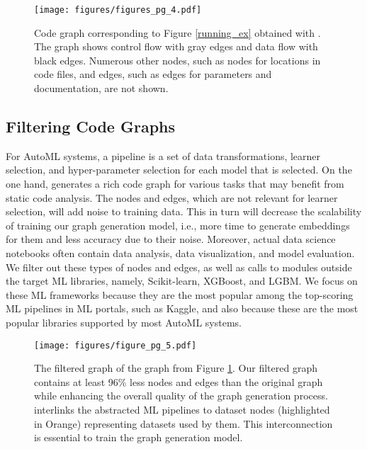 \begin{figure}
 \centering
  \texttt{[image: figures/figures\_pg\_4.pdf]}
  \ncp\ncp\ncp\ncp
  \caption{Code graph corresponding to Figure \ref{running_ex} obtained with {\sysGC}.  The graph shows control flow with gray edges and data flow with black edges. Numerous other nodes, such as nodes for locations in code files, and edges, such as edges for parameters and documentation, are not shown.}
  \label{static_analysis}
  \ncp\ncp\ncp\ncp
\end{figure}

     


\subsection{Filtering Code Graphs}
\label{abstraction}

For AutoML systems, a pipeline is a set of data transformations, learner selection, and hyper-parameter selection for each model that is selected. On the one hand, {\sysGC} generates a rich code graph for various tasks that may benefit from static code analysis. The nodes and edges, which are not relevant for learner selection, will add noise to training data. This in turn will decrease the scalability of training our graph generation model, i.e., more time to generate embeddings for them and less accuracy due to their noise. Moreover, actual data science notebooks often contain data analysis, data visualization, and model evaluation. We filter out these types of nodes and edges, as well as calls to modules outside the target ML libraries, namely, Scikit-learn, XGBoost, and LGBM. We focus on these ML frameworks because they are the most popular among the top-scoring ML pipelines in ML portals, such as Kaggle, and also because these are the most popular libraries supported by most AutoML systems. 

\begin{figure}
\ncp\ncp
 \centering
  \texttt{[image: figures/figure\_pg\_5.pdf]}
  \ncp\ncp\ncp\ncp\ncp\ncp\ncp
  \caption{The filtered graph of the graph from Figure \ref{static_analysis}. Our filtered graph contains at least 96\% less nodes and edges than the original graph while enhancing the overall quality of the graph generation process. {\sysname} interlinks the abstracted ML pipelines to dataset nodes (highlighted in Orange) representing datasets used by them. This interconnection is essential to train the {\sysname} graph generation model. 
  }
  \ncp\ncp\ncp\ncp\ncp\ncp
  \label{abstraction_figure}
\end{figure}

